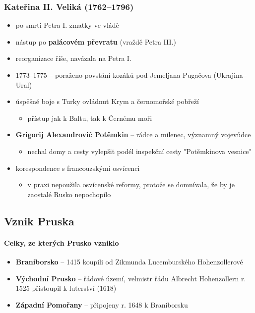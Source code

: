 \subsubsection{Kateřina II. Veliká (1762--1796)}
\begin{itemize}
\item po smrti Petra I. zmatky ve vládě
\item nástup po \textbf{palácovém převratu} (vraždě Petra III.)
\item reorganizace říše, navázala na Petra I.
\item 1773--1775 -- poraženo povstání kozáků pod Jemeljana Pugačova (Ukrajina--Ural)
\item úspěšné boje s Turky \ra ovládnut Krym a černomořské pobřeží
	\begin{itemize}
	\item přístup jak k Baltu, tak k Černému moři
	\end{itemize}
\item \textbf{Grigorij Alexandrovič Potěmkin} -- rádce a milenec, významný vojevůdce
	\begin{itemize}
	\item nechal domy a cesty vylepšit podél inspekční cesty \ra "Potěmkinova vesnice"
	\end{itemize}
\item korespondence s francouzskými osvícenci
	\begin{itemize}
	\item v praxi nepoužila osvícenské reformy, protože se domnívala, že by je zaostalé Rusko nepochopilo
	\end{itemize}
\end{itemize}

\subsection{Vznik Pruska}
\paragraph{Celky, ze kterých Prusko vzniklo}
\begin{itemize}
\item \textbf{Braniborsko} -- 1415 koupili od Zikmunda Lucemburského Hohenzollerové
\item \textbf{Východní Prusko} -- řádové území, velmistr řádu Albrecht Hohenzollern r. 1525 přistoupil k luterství (1618)
\item \textbf{Západní Pomořany} -- připojeny r. 1648 k Braniborsku
\end{itemize}

